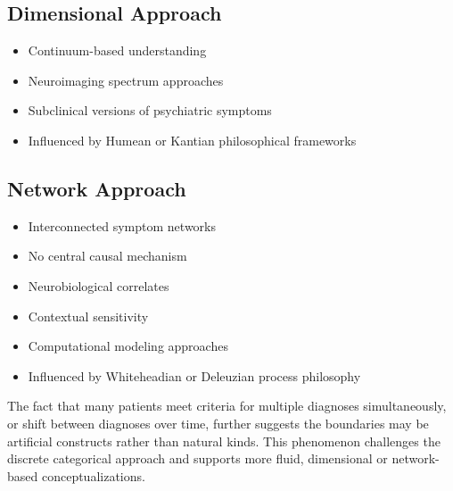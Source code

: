 \documentclass[a4paper]{article}
\begin{document}
\subsection{Dimensional Approach}

\begin{itemize}[leftmargin=2em]
    \item Continuum-based understanding
    \item Neuroimaging spectrum approaches
    \item Subclinical versions of psychiatric symptoms
    \item Influenced by Humean or Kantian philosophical frameworks
\end{itemize}

\subsection{Network Approach}

\begin{itemize}[leftmargin=2em]
    \item Interconnected symptom networks
    \item No central causal mechanism
    \item Neurobiological correlates
    \item Contextual sensitivity
    \item Computational modeling approaches
    \item Influenced by Whiteheadian or Deleuzian process philosophy
\end{itemize}

The fact that many patients meet criteria for multiple diagnoses simultaneously, or shift between diagnoses over time, further suggests the boundaries may be artificial constructs rather than natural kinds. This phenomenon challenges the discrete categorical approach and supports more fluid, dimensional or network-based conceptualizations.

\printbibliography
\end{document}
